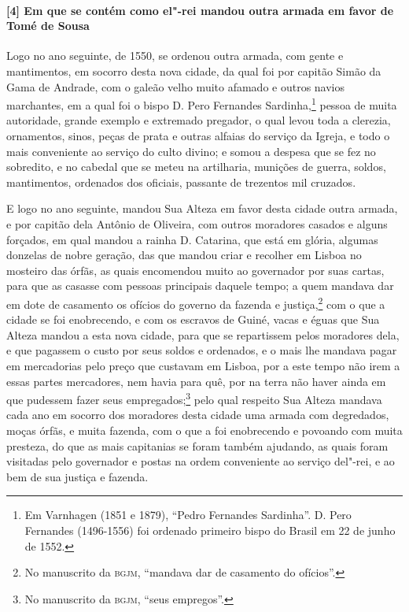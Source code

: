 \paragraph{[4] Em que se contém como el"-rei mandou outra armada em favor de Tomé de Sousa} \quad
Logo no ano seguinte, de 1550, se ordenou outra armada, com gente e mantimentos, em
socorro desta nova cidade, da qual foi por capitão Simão da Gama de Andrade, com o galeão
velho muito afamado e outros navios marchantes, em a qual foi o bispo D. Pero Fernandes
Sardinha,\footnote{ Em Varnhagen (1851 e 1879), ``Pedro Fernandes Sardinha''. D. Pero
Fernandes (1496-1556) foi ordenado primeiro bispo do Brasil em 22 de junho de 1552.}
pessoa de muita autoridade, grande exemplo e extremado pregador, o qual levou toda a
clerezia, ornamentos, sinos, peças de prata e outras alfaias do serviço da Igreja, e todo
o mais conveniente ao serviço do culto divino; e somou a despesa que se fez no sobredito,
e no cabedal que se meteu na artilharia, munições de guerra, soldos, mantimentos,
ordenados dos oficiais, passante de trezentos mil cruzados.

E logo no ano seguinte, mandou Sua Alteza em favor desta cidade outra armada, e por
capitão dela Antônio de Oliveira, com outros moradores casados e alguns forçados, em qual
mandou a rainha D. Catarina, que está em glória, algumas donzelas de nobre geração, das
que mandou criar e recolher em Lisboa no mosteiro das órfãs, as quais encomendou muito ao
governador por suas cartas, para que as casasse com pessoas principais daquele tempo; a
quem mandava dar em dote de casamento os ofícios do governo da fazenda e
justiça,\footnote{ No manuscrito da \textsc{bgjm}, ``mandava dar de casamento do
ofícios''.} com o que a cidade se foi enobrecendo, e com os escravos de Guiné, vacas e
éguas que Sua Alteza mandou a esta nova cidade, para que se repartissem pelos moradores
dela, e que pagassem o custo por seus soldos e ordenados, e o mais lhe mandava pagar em
mercadorias pelo preço que custavam em Lisboa, por a este tempo não irem a essas partes
mercadores, nem havia para quê, por na terra não haver ainda em que pudessem fazer seus
empregados;\footnote{ No manuscrito da \textsc{bgjm}, ``seus empregos''.} pelo qual
respeito Sua Alteza mandava cada ano em socorro dos moradores desta cidade uma armada com
degredados, moças órfãs, e muita fazenda, com o que a foi enobrecendo e povoando com muita
presteza, do que as mais capitanias se foram também ajudando, as quais foram visitadas
pelo governador e postas na ordem conveniente ao serviço del"-rei, e ao bem de sua justiça
e fazenda.


